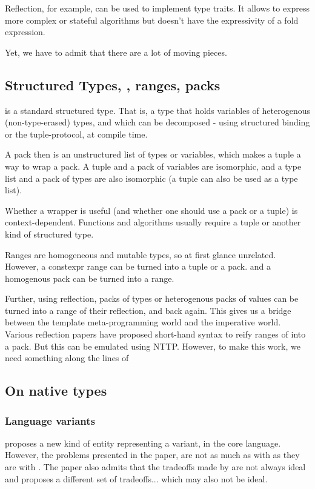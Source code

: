\documentclass{wg21}
\begin{document}
Reflection, for example, can be used to implement type traits. It allows to express more complex or stateful algorithms but doesn't have the expressivity of a fold expression.

Yet, we have to admit that there are a lot of moving pieces.

\subsection{Structured Types, , ranges, packs}

 is a standard structured type. That is, a type that holds variables of heterogenous (non-type-erased) types,
and which can be decomposed - using structured binding or the tuple-protocol, at compile time.

A pack then is an unstructured list of types or variables, which makes a tuple a way to wrap a pack.
A tuple and a pack of variables are isomorphic, and a type list and a pack of types are also isomorphic (a tuple can also be used as a type list).

Whether a wrapper is useful (and whether one should use a pack or a tuple) is context-dependent.
Functions and algorithms usually require a tuple or another kind of structured type.

Ranges are homogeneous and mutable types, so at first glance unrelated.
However, a constexpr range can be turned into a tuple or a pack. and a homogenous pack can be turned into a range.

Further, using reflection, packs of types or heterogenous packs of values can be turned into a range of their reflection, and back again.
This gives us a bridge between the template meta-programming world and the imperative world.
Various reflection papers have proposed short-hand syntax to reify ranges of  into a pack.
But this can be emulated using NTTP.
However, to make this work, we need something along the lines of 

\subsection{On native types}

\subsubsection{Language variants}

 proposes a new kind of entity representing a variant, in the core language.
However, the problems presented in the paper, are not as much as with  as they are with .
The paper also admits that the tradeoffs made by  are not always ideal and proposes a different set of tradeoffs... which may also not be ideal.
\end{document}
